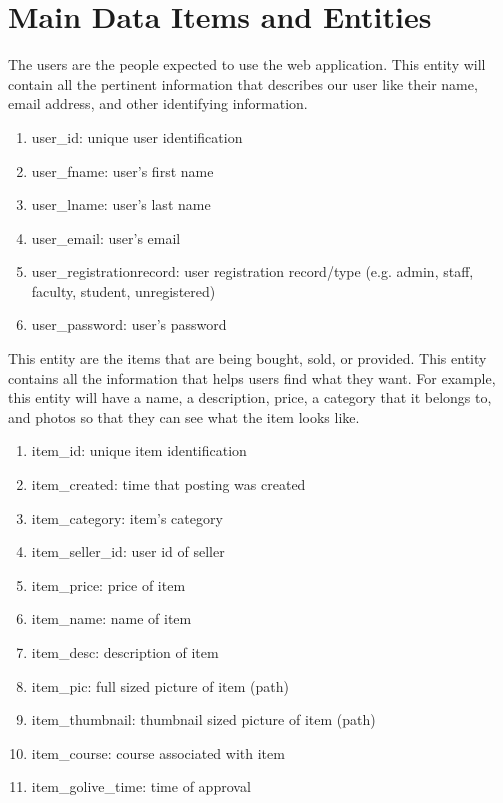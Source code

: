 \section{Main Data Items and Entities}

\begin{description}[font=\bfseries\itshape]

\item[user:] The users are the people expected to use the web application. This entity will contain all the pertinent information that describes our user like their name, email address, and other identifying information.
\begin{enumerate}
\item user\_id: unique user identification
\item user\_fname: user's first name
\item user\_lname: user's last name
\item user\_email: user's email
\item user\_registrationrecord: user registration record/type (e.g. admin, staff, faculty, student, unregistered)
\item user\_password: user's password
\end{enumerate}
	
\item[item:] This entity are the items that are being bought, sold, or provided.  This entity contains all the information that helps users find what they want.  For example, this entity will have a name, a description, price, a category that it belongs to, and photos so that they can see what the item looks like.
\begin{enumerate}
\item item\_id: unique item identification
\item item\_created: time that posting was created
\item item\_category: item's category
\item item\_seller\_id: user id of seller
\item item\_price: price of item
\item item\_name: name of item
\item item\_desc: description of item
\item item\_pic: full sized picture of item (path)
\item item\_thumbnail: thumbnail sized picture of item (path)
\item item\_course: course associated with item
\item item\_golive\_time: time of approval 
\end{enumerate}
	

\end{description}
